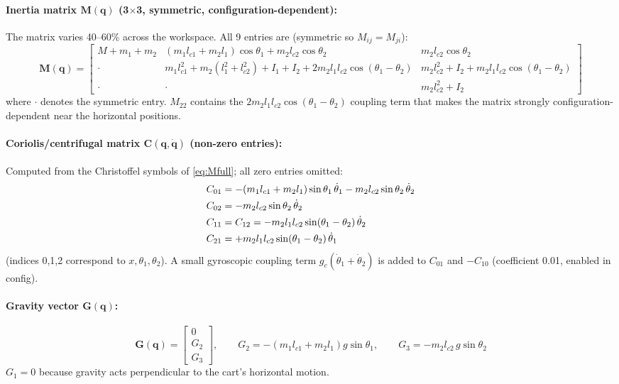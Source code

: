 \documentclass[11pt, a4paper]{article}
\newcommand{\vq}{\boldsymbol{q}}
\newcommand{\Mq}{\mathbf{M}(\vq)}
\newcommand{\Cq}{\mathbf{C}(\vq,\dot{\vq})}
\newcommand{\Gq}{\mathbf{G}(\vq)}
\begin{document}
\paragraph{Inertia matrix $\Mq$ (3$\times$3, symmetric, configuration-dependent):}
The matrix varies 40--60\% across the workspace. All 9 entries are (symmetric so $M_{ij}=M_{ji}$):
\begin{equation}
  \Mq =
  \begin{bmatrix}
    M + m_1 + m_2 &
      (m_1 l_{c1} + m_2 l_1)\cos\theta_1 + m_2 l_{c2}\cos\theta_2 &
      m_2 l_{c2}\cos\theta_2 \\[4pt]
    \cdot &
      m_1 l_{c1}^2 + m_2(l_1^2 + l_{c2}^2) + I_1 + I_2 + 2m_2 l_1 l_{c2}\cos(\theta_1-\theta_2) &
      m_2 l_{c2}^2 + I_2 + m_2 l_1 l_{c2}\cos(\theta_1-\theta_2) \\[4pt]
    \cdot & \cdot &
      m_2 l_{c2}^2 + I_2
  \end{bmatrix}
  \label{eq:Mfull}
\end{equation}
where $\cdot$ denotes the symmetric entry. $M_{22}$ contains the $2m_2 l_1 l_{c2}\cos(\theta_1-\theta_2)$
coupling term that makes the matrix strongly configuration-dependent near the horizontal positions.

\paragraph{Coriolis/centrifugal matrix $\Cq$ (non-zero entries):}
Computed from the Christoffel symbols of \eqref{eq:Mfull}; all zero entries omitted:
\begin{align}
  C_{01} &= -(m_1 l_{c1} + m_2 l_1)\sin\theta_1\,\dot{\theta}_1
             - m_2 l_{c2}\sin\theta_2\,\dot{\theta}_2 \notag\\
  C_{02} &= -m_2 l_{c2}\sin\theta_2\,\dot{\theta}_2 \notag\\
  C_{11} &= C_{12} = -m_2 l_1 l_{c2}\sin(\theta_1-\theta_2)\,\dot{\theta}_2 \notag\\
  C_{21} &= +m_2 l_1 l_{c2}\sin(\theta_1-\theta_2)\,\dot{\theta}_1
  \label{eq:Cfull}
\end{align}
(indices 0,1,2 correspond to $x, \theta_1, \theta_2$).
A small gyroscopic coupling term $g_c(\dot{\theta}_1+\dot{\theta}_2)$ is added to
$C_{01}$ and $-C_{10}$ (coefficient 0.01, enabled in config).

\paragraph{Gravity vector $\Gq$:}
\begin{equation}
  \Gq = \begin{bmatrix} 0 \\ G_2 \\ G_3 \end{bmatrix}, \qquad
  G_2 = -(m_1 l_{c1} + m_2 l_1)g\sin\theta_1, \qquad
  G_3 = -m_2 l_{c2}\,g\sin\theta_2
  \label{eq:Gvec}
\end{equation}
$G_1 = 0$ because gravity acts perpendicular to the cart's horizontal motion.
\end{document}

